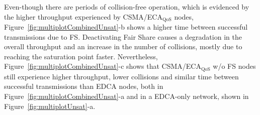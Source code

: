 


Even-though there are periods of collision-free operation, which is evidenced by the higher throughput experienced by CSMA/ECA$_{\text{QoS}}$ nodes, Figure~\ref{fig:multiplotCombinedUnsat}-b shows a higher time between successful transmissions due to FS. Deactivating Fair Share causes a degradation in the overall throughput and an increase in the number of collisions, mostly due to reaching the saturation point faster. Nevertheless, Figure~\ref{fig:multiplotCombinedUnsat}-c shows that CSMA/ECA$_{\text{QoS}}$ w/o FS nodes still experience higher throughput, lower collisions and similar time between successful transmissions than EDCA nodes, both in Figure~\ref{fig:multiplotCombinedUnsat}-a and in a EDCA-only network, shown in Figure~\ref{fig:multiplotUnsat}-a.

